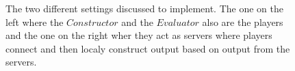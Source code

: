 \begin{figure}
\label{con_swap_fig}
\centering

\caption{The two different settings discussed to implement. The one on the left where the $Constructor$ and the $Evaluator$ also are the players and the one on the right wher they act as servers where players connect and then localy construct output based on output from the servers.}
\end{figure}
